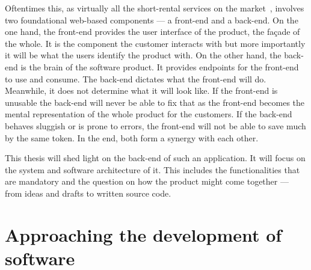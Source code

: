 \documentclass[12pt,a4paper,twoside]{report}
\begin{document}
Oftentimes this, as virtually all the short-rental services on the market~\cn,
involves two foundational web-based components --- a front-end and a back-end\cn.
On the one hand, the front-end provides the user interface of the product, the façade of the whole.
It is the component the customer interacts with but more importantly it will be
what the users identify the product with.
On the other hand, the back-end is the brain of the software product.
It provides endpoints for the front-end to use and consume. The back-end dictates
what the front-end will do. Meanwhile, it does not determine what it will look like.
If the front-end is unusable the back-end will never be able to fix that as the
front-end becomes the mental representation of the whole product for the customers.
If the back-end behaves sluggish or is prone to errors, the front-end will not
be able to save much by the same token. In the end, both form a synergy with each other.

This thesis will shed light on the back-end of such an application.
It will focus on the system and software architecture of it.
This includes the functionalities that are mandatory and the question on
how the product might come together --- from ideas and drafts to written source code.


\section{Approaching the development of software} \label{sect:software-development-process}
\end{document}
